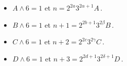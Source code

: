 \begin{example}
	\vspace{-1ex}
	\begin{multicols}{2}
	\begin{itemize}
		\item $A \wedge 6 = 1$
		      et
		      $n     = 2^{2a}   3^{2\alpha+1} A$\,.

		\item $B \wedge 6 = 1$
		      et
		      $n + 1 = 2^{2b+1} 3^{2\beta}    B$\,.

		\item $C \wedge 6 = 1$
		      et
		      $n + 2 = 2^{2c}   3^{2\gamma}   C$\,.

		\item $D \wedge 6 = 1$
		      et
		      $n + 3 = 2^{2d+1} 3^{2\delta+1} D$\,.
	\end{itemize}
	\end{multicols}
\end{example}


